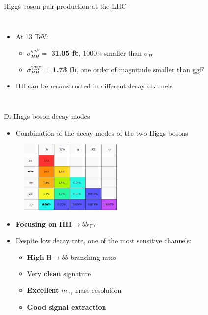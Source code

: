 \begin{frame}{Higgs boson pair production at the LHC}
\begin{columns}

\begin{itemize}
    \item At 13 TeV: 
    \begin{itemize}
        \item \textcolor{HHred}{\textbf{$\sigma^{ggF}_{HH} = $ 31.05 fb}}, 1000$\times$ smaller than $\sigma_{H}$
        \item \textcolor{HHturquoise_d}{\textbf{$\sigma^{VBF}_{HH} = $ 1.73 fb}}, one order of magnitude smaller than ggF
    \end{itemize}
    \pause
    \item HH can be reconstructed in different decay channels
\end{itemize}
\end{columns}
\end{frame}

\begin{frame}{Di-Higgs boson decay modes}

\begin{itemize}
    \item Combination of the decay modes of the two Higgs bosons
\end{itemize}
\begin{figure}
    \centering
    \includegraphics[width=0.45\textwidth]{Part1/Img/HH_decays.png}
\end{figure}
\pause
\begin{itemize}
    \item \textbf{\textcolor{HHred}{Focusing on HH$\to b\bar{b}\gamma\gamma$}}
    \item Despite low decay rate, one of the most sensitive channels:
    \begin{itemize}
        \item \textbf{High} H$\to b\bar{b}$ branching ratio
        \item Very \textbf{clean} signature
        \item \textbf{Excellent} $m_{\gamma\gamma}$ mass resolution
        \item \textbf{Good signal extraction}
    \end{itemize}
\end{itemize}

\end{frame}

